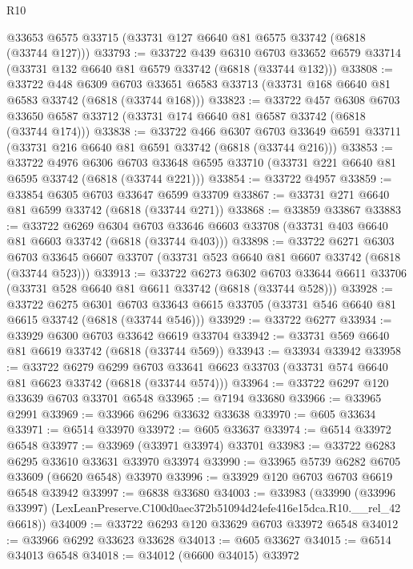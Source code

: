 \begin{lexlean}{R10}
\begin{coremodule}
    @33653
    @6575
    @33715
    (@33731 @127 @6640 @81 @6575 @33742 (@6818 (@33744 @127)))
@33793 := @33722
    @439
    @6310
    @6703
    @33652
    @6579
    @33714
    (@33731 @132 @6640 @81 @6579 @33742 (@6818 (@33744 @132)))
@33808 := @33722
    @448
    @6309
    @6703
    @33651
    @6583
    @33713
    (@33731 @168 @6640 @81 @6583 @33742 (@6818 (@33744 @168)))
@33823 := @33722
    @457
    @6308
    @6703
    @33650
    @6587
    @33712
    (@33731 @174 @6640 @81 @6587 @33742 (@6818 (@33744 @174)))
@33838 := @33722
    @466
    @6307
    @6703
    @33649
    @6591
    @33711
    (@33731 @216 @6640 @81 @6591 @33742 (@6818 (@33744 @216)))
@33853 := @33722
    @4976
    @6306
    @6703
    @33648
    @6595
    @33710
    (@33731 @221 @6640 @81 @6595 @33742 (@6818 (@33744 @221)))
@33854 := @33722 @4957
@33859 := @33854 @6305 @6703 @33647 @6599 @33709
@33867 := @33731 @271 @6640 @81 @6599 @33742 (@6818 (@33744 @271))
@33868 := @33859 @33867
@33883 := @33722
    @6269
    @6304
    @6703
    @33646
    @6603
    @33708
    (@33731 @403 @6640 @81 @6603 @33742 (@6818 (@33744 @403)))
@33898 := @33722
    @6271
    @6303
    @6703
    @33645
    @6607
    @33707
    (@33731 @523 @6640 @81 @6607 @33742 (@6818 (@33744 @523)))
@33913 := @33722
    @6273
    @6302
    @6703
    @33644
    @6611
    @33706
    (@33731 @528 @6640 @81 @6611 @33742 (@6818 (@33744 @528)))
@33928 := @33722
    @6275
    @6301
    @6703
    @33643
    @6615
    @33705
    (@33731 @546 @6640 @81 @6615 @33742 (@6818 (@33744 @546)))
@33929 := @33722 @6277
@33934 := @33929 @6300 @6703 @33642 @6619 @33704
@33942 := @33731 @569 @6640 @81 @6619 @33742 (@6818 (@33744 @569))
@33943 := @33934 @33942
@33958 := @33722
    @6279
    @6299
    @6703
    @33641
    @6623
    @33703
    (@33731 @574 @6640 @81 @6623 @33742 (@6818 (@33744 @574)))
@33964 := @33722 @6297 @120 @33639 @6703 @33701 @6548
@33965 := @7194 @33680
@33966 := @33965 @2991
@33969 := @33966 @6296 @33632 @33638
@33970 := @605 @33634
@33971 := @6514 @33970
@33972 := @605 @33637
@33974 := @6514 @33972 @6548
@33977 := @33969 (@33971 @33974) @33701
@33983 := @33722 @6283 @6295 @33610 @33631 @33970 @33974
@33990 := @33965 @5739 @6282 @6705 @33609 (@6620 @6548) @33970
@33996 := @33929 @120 @6703 @6703 @6619 @6548 @33942
@33997 := @6838 @33680
@34003 := @33983
    (@33990 (@33996 @33997) (LexLeanPreserve.C100d0aec372b51094d24efe416e15dca.R10.__rel_42 @6618))
@34009 := @33722 @6293 @120 @33629 @6703 @33972 @6548
@34012 := @33966 @6292 @33623 @33628
@34013 := @605 @33627
@34015 := @6514 @34013 @6548
@34018 := @34012 (@6600 @34015) @33972

\end{coremodule}
\end{lexlean}
